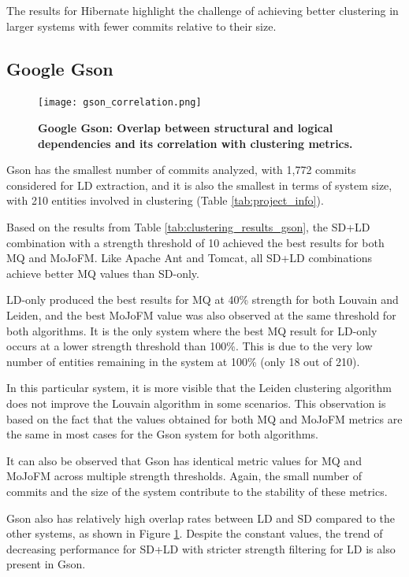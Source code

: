 \documentclass{ieeeaccess}
\begin{document}
The results for Hibernate highlight the challenge of achieving better clustering in larger systems with fewer commits relative to their size.


\subsection{Google Gson}


\begin{figure}[t!]
  \centering
  \texttt{[image: gson\_correlation.png]}
  \caption{\textbf{Google Gson: Overlap between structural and logical dependencies and its correlation with clustering metrics.}}
  \label{fig:gson_correlation}
\end{figure}

Gson has the smallest number of commits analyzed, with 1,772 commits considered for LD extraction, and it is also the smallest in terms of system size, with 210 entities involved in clustering (Table \ref{tab:project_info}).

Based on the results from Table \ref{tab:clustering_results_gson}, the SD+LD combination with a strength threshold of 10 achieved the best results for both MQ and MoJoFM. Like Apache Ant and Tomcat, all SD+LD combinations achieve better MQ values than SD-only.

LD-only produced the best results for MQ at 40\% strength for both Louvain and Leiden, and the best MoJoFM value was also observed at the same threshold for both algorithms. It is the only system where the best MQ result for LD-only occurs at a lower strength threshold than 100\%. This is due to the very low number of entities remaining in the system at 100\% (only 18 out of 210).

In this particular system, it is more visible that the Leiden clustering algorithm does not improve the Louvain algorithm in some scenarios. This observation is based on the fact that the values obtained for both MQ and MoJoFM metrics are the same in most cases for the Gson system for both algorithms.

It can also be observed that Gson has identical metric values for MQ and MoJoFM across multiple strength thresholds. Again, the small number of commits and the size of the system contribute to the stability of these metrics.

Gson also has relatively high overlap rates between LD and SD compared to the other systems, as shown in Figure \ref{fig:gson_correlation}. Despite the constant values, the trend of decreasing performance for SD+LD with stricter strength filtering for LD is also present in Gson.
\end{document}
